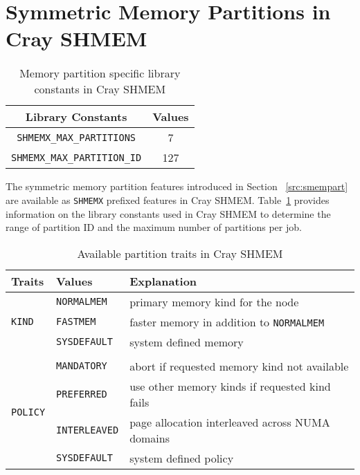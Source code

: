 \section{Symmetric Memory Partitions in Cray SHMEM}
\label{src:implement}
\begin{table}[h!]
\centering
\vspace{-20pt}
\begin{tabular}{|c c|}\hline
    Library Constants & Values \\[0.5ex]
    \hline\hline
    \texttt{SHMEMX\_MAX\_PARTITIONS} & 7 \\
    \texttt{SHMEMX\_MAX\_PARTITION\_ID} & 127 \\
    \hline
\end{tabular}
\caption{Memory partition specific library constants in Cray SHMEM}
\label{tab:const}
\end{table}
\vspace{-20pt}

The symmetric memory partition features introduced in Section
~\ref{src:smempart} are available as \texttt{SHMEMX} prefixed
features in Cray SHMEM. Table~\ref{tab:const} provides information
on the library constants used in Cray SHMEM to determine the
range of partition ID and the maximum number of partitions per job.

\begin{table}[h!]
\centering
\vspace{-20pt}
\begin{tabular}{|l l l|}\hline
    Traits & Values & Explanation\\[0.5ex]
    \hline\hline
    \multirow{3}{4em}{\texttt{KIND}} & \texttt{NORMALMEM}  & primary memory kind for
                                                             the node \\
                            & \texttt{FASTMEM}    & faster memory in addition
                                                    to \texttt{NORMALMEM} \\
                            & \texttt{SYSDEFAULT} & system defined memory \\
                            &&\\
    \multirow{4}{4em}{\texttt{POLICY}} & \texttt{MANDATORY}
                                                     & abort if requested memory
                                                       kind not available \\
                              & \texttt{PREFERRED}   & use other memory kinds if
                                                       requested kind fails \\
                              & \texttt{INTERLEAVED} & page allocation interleaved
                                                       across NUMA domains \\
                              & \texttt{SYSDEFAULT}  & system defined policy \\
    \hline
\end{tabular}
\caption{Available partition traits in Cray SHMEM}
\label{tab:trait}
\end{table}
\vspace{-20pt}

